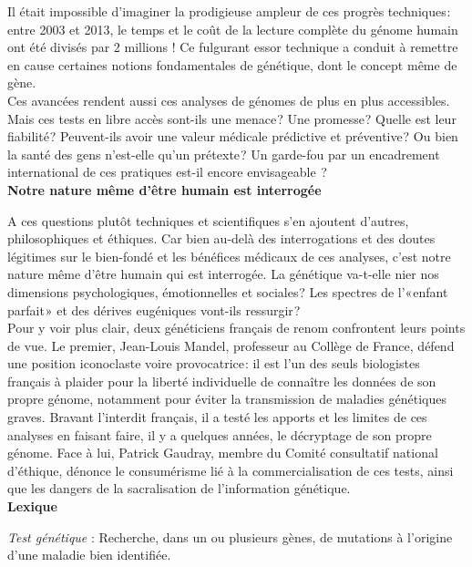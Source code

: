 \documentclass[8pt]{article}
\begin{document}
Il était impossible d’imaginer la prodigieuse ampleur de ces progrès techniques : entre 2003 et 2013, le temps et le coût de la lecture complète du génome humain ont été divisés par 2 millions ! Ce fulgurant essor technique a conduit à remettre en cause certaines notions fondamentales de génétique, dont le concept même de gène. \\

Ces avancées rendent aussi ces analyses de génomes de plus en plus accessibles. Mais ces tests en libre accès sont-ils une menace ? Une promesse ? Quelle est leur fiabilité ? Peuvent-ils avoir une valeur médicale prédictive et préventive ? Ou bien la santé des gens n’est-elle qu’un prétexte ? Un garde-fou par un encadrement international de ces pratiques est-il encore envisageable  ? \\

\textbf{Notre nature même d’être humain est interrogée}

A ces questions plutôt techniques et scientifiques s’en ajoutent d’autres, philosophiques et éthiques. Car bien au-delà des interrogations et des doutes légitimes sur le bien-fondé et les bénéfices médicaux de ces analyses, c’est notre nature même d’être humain qui est interrogée. La génétique va-t-elle nier nos dimensions psychologiques, émotionnelles et sociales ? Les spectres de l’« enfant parfait » et des dérives eugéniques vont-ils ressurgir ? \\

Pour y voir plus clair, deux généticiens français de renom confrontent leurs points de vue. Le premier, Jean-Louis Mandel, professeur au Collège de France, défend une position iconoclaste voire provocatrice : il est l’un des seuls biologistes français à plaider pour la liberté individuelle de connaître les données de son propre génome, notamment pour éviter la transmission de maladies génétiques graves. Bravant l’interdit français, il a testé les apports et les limites de ces analyses en faisant faire, il y a quelques années, le décryptage de son propre génome. Face à lui, Patrick Gaudray, membre du Comité consultatif national d’éthique, dénonce le consumérisme lié à la commercialisation de ces tests, ainsi que les dangers de la sacralisation de l’information génétique. \\

\textbf{Lexique}

\textit{Test génétique} : Recherche, dans un ou plusieurs gènes, de mutations à l’origine d’une maladie bien identifiée. \\
\end{document}

